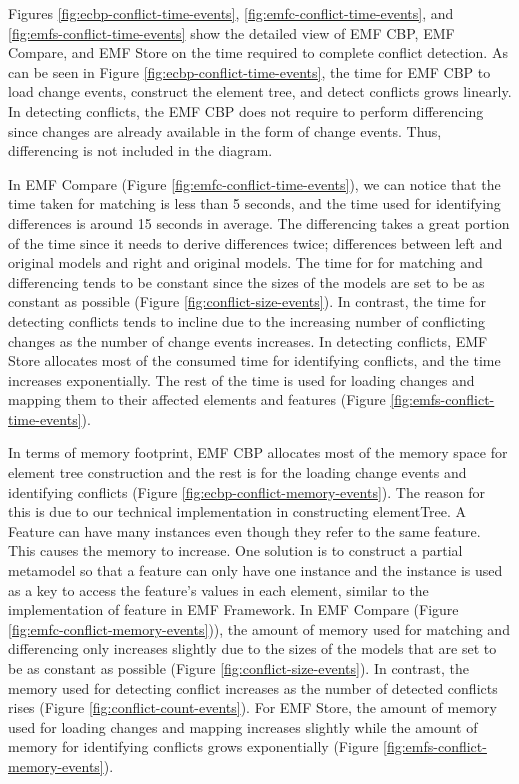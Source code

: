 Figures \ref{fig:ecbp-conflict-time-events}, \ref{fig:emfc-conflict-time-events}, and \ref{fig:emfs-conflict-time-events} show the detailed view of EMF CBP, EMF Compare, and EMF Store on the time required to complete conflict detection. As can be seen in Figure \ref{fig:ecbp-conflict-time-events}, the time for EMF CBP to load change events, construct the element tree, and detect conflicts grows linearly. In detecting conflicts, the EMF CBP does not require to perform differencing since changes are already available in the form of change events. Thus, differencing is not included in the diagram. 

In EMF Compare (Figure \ref{fig:emfc-conflict-time-events}), we can notice that the time taken for matching is less than 5 seconds, and the time used for identifying differences is around 15 seconds in average. The differencing takes a great portion of the time since it needs to derive differences twice; differences between left and original models and right and original models. The time for for matching and differencing tends to be constant since the sizes of the models are set to be as constant as possible (Figure \ref{fig:conflict-size-events}). In contrast, the time for detecting conflicts tends to incline due to the increasing number of conflicting changes as the number of change events increases. In detecting conflicts, EMF Store allocates most of the consumed time for identifying conflicts, and the time increases exponentially. The rest of the time is used for loading changes and mapping them to their affected elements and features (Figure \ref{fig:emfs-conflict-time-events}). 

In terms of memory footprint, EMF CBP allocates most of the memory space for element tree construction and the rest is for the loading change events and identifying conflicts (Figure \ref{fig:ecbp-conflict-memory-events}). The reason for this is due to our technical implementation in constructing \textsf{elementTree}. A Feature can have many instances even though they refer to the same feature. This causes the memory to increase. One solution is to construct a partial metamodel so that a feature can only have one instance and the instance is used as a key to access the feature's values in each element, similar to the implementation of feature in EMF Framework. In EMF Compare (Figure \ref{fig:emfc-conflict-memory-events})), the amount of memory used for matching and differencing only increases slightly due to the sizes of the models that are set to be as constant as possible (Figure \ref{fig:conflict-size-events}). In contrast, the memory used for detecting conflict increases as the number of detected conflicts rises (Figure \ref{fig:conflict-count-events}). For EMF Store, the amount of memory used for loading changes and mapping increases slightly while the amount of memory for identifying conflicts grows exponentially (Figure \ref{fig:emfs-conflict-memory-events}).

